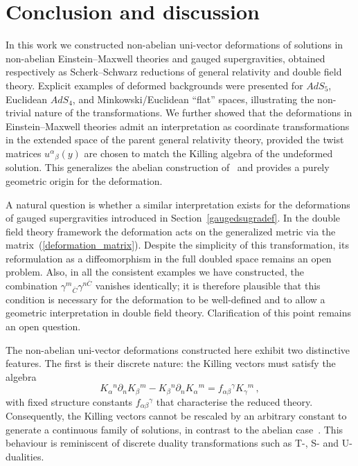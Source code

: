 \documentclass[12pt, utf8]{article}
\numberwithin{equation}{section}
\begin{document}
\section{Conclusion and discussion}\label{Concl}

In this work we constructed non-abelian uni-vector deformations of solutions in non-abelian Einstein--Maxwell theories and gauged supergravities, obtained respectively as Scherk--Schwarz reductions of general relativity and double field theory. Explicit examples of deformed backgrounds were presented for $AdS_5$, Euclidean $AdS_4$, and Minkowski/Euclidean ``flat'' spaces, illustrating the non-trivial nature of the transformations. We further showed that the deformations in Einstein--Maxwell theories admit an interpretation as coordinate transformations in the extended space of the parent general relativity theory, provided the twist matrices $u^\alpha{}_\beta(y)$ are chosen to match the Killing algebra of the undeformed solution. This generalizes the abelian construction of~\cite{Gubarev:2025hvr} and provides a purely geometric origin for the deformation.

A natural question is whether a similar interpretation exists for the deformations of gauged supergravities introduced in Section~\ref{gaugedsugradef}. In the double field theory framework the deformation acts on the generalized metric via the matrix~(\ref{deformation_matrix}). Despite the simplicity of this transformation, its reformulation as a diffeomorphism in the full doubled space remains an open problem. Also, in all the consistent examples we have constructed, the combination $\gamma^m{}_{\bar{C}}\gamma^{n\bar{C}}$ vanishes identically; it is therefore plausible that this condition is necessary for the deformation to be well-defined and to allow a geometric interpretation in double field theory. Clarification of this point remains an open question.

The non-abelian uni-vector deformations constructed here exhibit two distinctive features. The first is their discrete nature: the Killing vectors must satisfy the algebra
\begin{equation}
    K_{\alpha}{}^{n}\partial_{n} K_{\beta}{}^{m} -   K_{\beta}{}^{n}\partial_{n} K_{\alpha}{}^{m} = f_{\alpha \beta}{}^{\gamma} K_{\gamma}{}^{m} \, ,
\end{equation}
with fixed structure constants $f_{\alpha\beta}{}^\gamma$ that characterise the reduced theory. Consequently, the Killing vectors cannot be rescaled by an arbitrary constant to generate a continuous family of solutions, in contrast to the abelian case~\cite{Gubarev:2025hvr}. This behaviour is reminiscent of discrete duality transformations such as T-, S- and U-dualities.
\end{document}
